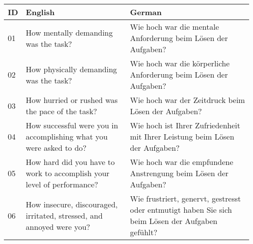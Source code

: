 \begin{ctable}
    \begin{tabularx}{\textwidth}{l|X|X}
        \textbf{ID} & \textbf{English} & \textbf{German} \\
        \hline
        01 & How mentally demanding was the task? & Wie hoch war die mentale Anforderung beim Lösen der Aufgaben? \\
        02 & How physically demanding was the task? & Wie hoch war die körperliche Anforderung beim Lösen der Aufgaben? \\
        03 & How hurried or rushed was the pace of the task? & Wie hoch war der Zeitdruck beim Lösen der Aufgaben? \\
        04 & How successful were you in accomplishing what you were asked to do? & Wie hoch ist Ihrer Zufriedenheit mit Ihrer Leistung beim Lösen der Aufgaben? \\
        05 & How hard did you have to work to accomplish your level of performance? & Wie hoch war die empfundene Anstrengung beim Lösen der Aufgaben? \\
        06 & How insecure, discouraged, irritated, stressed, and annoyed were you? & Wie frustriert, genervt, gestresst oder entmutigt haben Sie sich beim Lösen der Aufgaben gefühlt? \\
    \end{tabularx}
\end{ctable}

